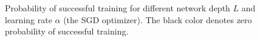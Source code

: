 \begin{figure}
\begin{subfigure}{8mm}
\end{subfigure}%
\caption{Probability of successful training for different network depth $L$ and learning rate $\alpha$ (the SGD optimizer). The black color denotes zero probability of successful training.
}
\label{fig:mnist_sim}
\end{figure}